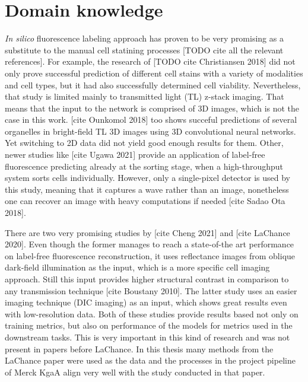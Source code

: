 \section{Domain knowledge}

    \textit{In silico} fluorescence labeling approach has proven to be very promising as a substitute to the manual cell statining processes [TODO cite all the relevant references]. For example, the research of [TODO cite Christiansen 2018] did not only prove successful prediction of different cell stains with a variety of modalities and cell types, but it had also successfully determined cell viability. Nevertheless, that study is limited mainly to transmitted light (TL) z-stack imaging. That means that the input to the network is comprised of 3D images, which is not the case in this work. [cite Ounkomol 2018] too shows succeful predictions of several organelles in bright-field TL 3D images using 3D convolutional neural networks. Yet switching to 2D data did not yield good enough results for them. Other, newer studies like [cite Ugawa 2021] provide an application of label-free fluorescence predicting already at the sorting stage, when a high-throughput system sorts cells individually. However, only a single-pixel detector is used by this study, meaning that it captures a wave rather than an image, nonetheless one can recover an image with heavy computations if needed [cite Sadao Ota 2018].
    
    There are two very promising studies by [cite Cheng 2021] and [cite LaChance 2020]. Even though the former manages to reach a state-of-the art performance on label-free fluorescence reconstruction, it uses reflectance images from oblique dark-field illumination as the input, which is a more specific cell imaging approach. Still this input provides higher structural contrast in comparison to any transmission technique [cite Boustany 2010]. The latter study uses an easier imaging technique (DIC imaging) as an input, which shows great results even with low-resolution data. Both of these studies provide results based not only on training metrics, but also on performance of the models for metrics used in the downstream tasks. This is very important in this kind of research and was not present in papers before LaChance. In this thesis many methods from the LaChance paper were used as the data and the processes in the project pipeline of Merck KgaA align very well with the study conducted in that paper.
    
